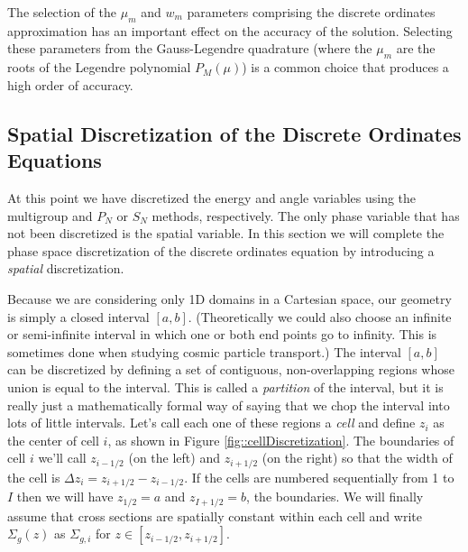 \documentclass[11pt]{article}
\begin{document}
The selection of the \(\mu_m\) and \(w_m\) parameters comprising the discrete ordinates approximation has an important effect on the accuracy of the solution.  Selecting these parameters from the Gauss-Legendre quadrature (where the \(\mu_m\) are the roots of the Legendre polynomial \(P_M(\mu)\)) is a common choice that produces a high order of accuracy.
\subsection{Spatial Discretization of the Discrete Ordinates Equations}
\label{sec:orgheadline14}
At this point we have discretized the energy and angle variables using the multigroup and \(P_N\) or \(S_N\) methods, respectively.  The only phase variable that has not been discretized is the spatial variable.  In this section we will complete the phase space discretization of the discrete ordinates equation by introducing a \emph{spatial} discretization.

Because we are considering only 1D domains in a Cartesian space, our geometry is simply a closed interval \([a,b]\).  (Theoretically we could also choose an infinite or semi-infinite interval in which one or both end points go to infinity.  This is sometimes done when studying cosmic particle transport.)  The interval \([a,b]\) can be discretized by defining a set of contiguous, non-overlapping regions whose union is equal to the interval.  This is called a \emph{partition} of the interval, but it is really just a mathematically formal way of saying that we chop the interval into lots of little intervals.  Let's call each one of these regions a \emph{cell} and define \(z_i\) as the center of cell \(i\), as shown in Figure \ref{fig::cellDiscretization}.  The boundaries of cell \(i\) we'll call \(z_{i-1/2}\) (on the left) and \(z_{i+1/2}\) (on the right) so that the width of the cell is \(\Delta z_i = z_{i+1/2} - z_{i-1/2}\).  If the cells are numbered sequentially from 1 to \(I\) then we will have \(z_{1/2} = a\) and \(z_{I+1/2} = b\), the boundaries.  We will finally assume that cross sections are spatially constant within each cell and write \(\Sigma_g(z)\) as \(\Sigma_{g,i}\) for \(z \in [z_{i-1/2},z_{i+1/2}]\).
\end{document}
